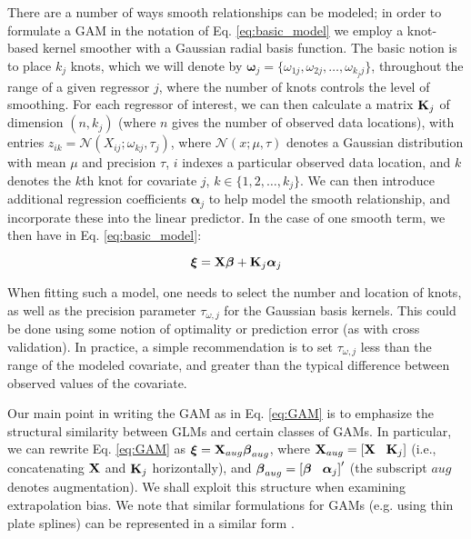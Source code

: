\documentclass[12pt,fleqn]{article}
\begin{document}
\begin{flushleft}
\hspace{.5in}There are a number of ways smooth relationships can be modeled; in order to formulate a GAM in the notation of Eq. \ref{eq:basic_model} we employ a knot-based kernel smoother with a Gaussian radial basis function.  The basic notion is to place $k_j$ knots, which we will denote by $\boldsymbol{\omega}_j = \{ \omega_{1j},\omega_{2j},\hdots,\omega_{k_j j} \}$, throughout the range of a given regressor $j$, where the number of knots controls the level of smoothing.  For each regressor of interest, we can then calculate a matrix ${\bf K}_j$ of dimension $(n,k_j)$ (where $n$ gives the number of observed data locations), with entries $z_{ik}=\mathcal{N}(X_{ij};\omega_{kj},\tau_j)$, where $\mathcal{N}(x;\mu,\tau)$ denotes a Gaussian distribution with mean $\mu$ and precision $\tau$, $i$ indexes a particular observed data location, and $k$ denotes the $k$th knot for covariate $j$, $k \in \{1,2,\hdots,k_j \}$. We can then introduce additional regression coefficients $\boldsymbol{\alpha}_j$ to help model the smooth relationship, and incorporate these into the linear predictor.  In the case of one smooth term, we then have  in Eq. \ref{eq:basic_model}:
\begin{linenomath*}
\begin{equation}
  \label{eq:GAM}
  \boldsymbol{\xi}={\bf X} \boldsymbol{\beta} + {\bf K}_j \boldsymbol{\alpha}_j
\end{equation}
\end{linenomath*}
When fitting such a model, one needs to select the number and location of knots, as well as the precision parameter $\tau_{\omega,j}$ for the Gaussian basis kernels.  This could be done using some notion of optimality or prediction error (as with cross validation).  In practice, a simple recommendation is to set $\tau_{\omega,j}$ less than the range of the modeled covariate, and greater than the typical difference between observed values of the covariate.

\hspace{.5in}Our main point in writing the GAM as in Eq. \ref{eq:GAM} is to emphasize the structural similarity between GLMs and certain classes
of GAMs.  In particular,
we can rewrite Eq. \ref{eq:GAM} as
$\boldsymbol{\xi}={\bf X}_{aug} \boldsymbol{\beta}_{aug}$,
where ${\bf X}_{aug} = \left[ {\bf X} \hspace{3mm} {\bf K}_j \right]$ (i.e., concatenating ${\bf X}$ and ${\bf K}_j$ horizontally), and $\boldsymbol{\beta}_{aug}=\left[  \boldsymbol{\beta} \hspace{3mm} \boldsymbol{\alpha}_j \right] ^\prime$ (the subscript $aug$ denotes augmentation).  We shall exploit this structure when examining
extrapolation bias.  We note that similar formulations for GAMs (e.g. using thin plate splines) can be represented in a similar form \citep[cf.][]{CrainiceanuEtAl2005}.


\end{flushleft}
\end{document}
